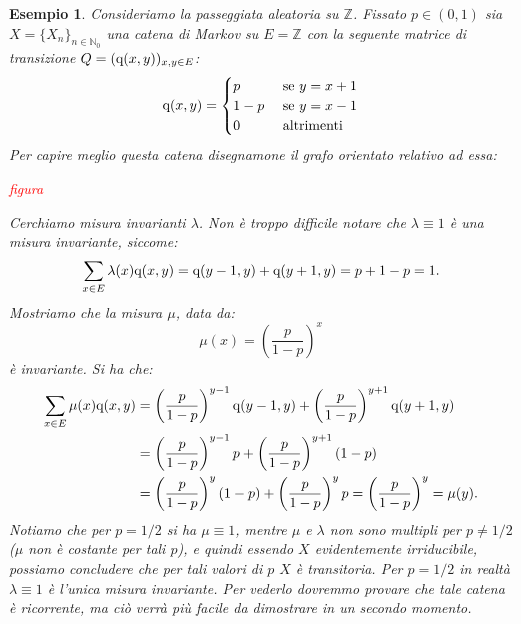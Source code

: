 \documentclass[11pt]{book}
\theoremstyle{Definizione}
\theoremstyle{TeoremaProposizioneLemmaCorollario}
\theoremstyle{OsservazioneNota}
\newtheorem{myes}{Esempio}[section]
\newcommand{\N}{\mathbb{N}}
\newcommand{\Z}{\mathbb{Z}}
\newcommand{\q}{\textup{q}}
\begin{document}
\begin{myes}
Consideriamo la passeggiata aleatoria su $\Z$. Fissato $p\in (0,1)$ sia $X = \{X_n\}_{n\in \N_0}$ una catena di Markov su $E = \Z$ con la seguente matrice di transizione $Q = (\q(x,y))_{x,y\in E}$:
$$
\q(x,y) = \begin{cases}
p   &\textup{ se }y = x+1\\
1-p &\textup{ se }y = x-1\\
0   &\textup{ altrimenti}
\end{cases}
$$
Per capire meglio questa catena disegnamone il grafo orientato relativo ad essa:
\begin{center}
\textcolor{red}{figura}
\end{center}
Cerchiamo misura invarianti $\lambda$. Non è troppo difficile notare che $\lambda \equiv 1$ è una misura invariante, siccome:
$$
\sum_{x\in E} \lambda(x)\q(x,y) = \q(y-1,y)+\q(y+1,y) = p+1-p = 1.
$$
Mostriamo che la misura $\mu$, data da:
$$
\mu(x) = \left(\frac{p}{1-p}\right)^x
$$
è invariante. Si ha che:
\begin{align*}
\sum_{x\in E}\mu(x)\q(x,y) &= \left(\frac{p}{1-p}\right)^{y-1}\q(y-1,y) + \left(\frac{p}{1-p}\right)^{y+1}\q(y+1,y)\\
&= \left(\frac{p}{1-p}\right)^{y-1}p + \left(\frac{p}{1-p}\right)^{y+1}(1-p)\\
&= \left(\frac{p}{1-p}\right)^{y}(1-p) + \left(\frac{p}{1-p}\right)^{y}p = \left(\frac{p}{1-p}\right)^y = \mu(y).
\end{align*}
Notiamo che per $p = 1/2$ si ha $\mu \equiv 1$, mentre $\mu$ e $\lambda$ non sono multipli per $p\neq 1/2$ ($\mu$ non è costante per tali $p$), e quindi essendo $X$ evidentemente irriducibile, possiamo concludere che per tali valori di $p$ $X$ è transitoria. Per $p = 1/2$ in realtà $\lambda \equiv 1$ è l'unica misura invariante. Per vederlo dovremmo provare che tale catena è ricorrente, ma ciò verrà più facile da dimostrare in un secondo momento.
\end{myes}
\end{document}
